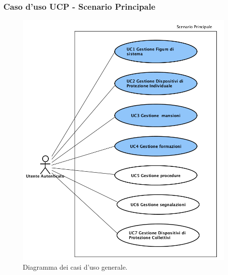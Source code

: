 	\subsubsection{Caso d'uso UCP - Scenario Principale }
	\begin{figure}[H]
		\begin{center}
			\includegraphics[width=11cm]{Pics/Diagramma_generale_dei_casi_d_uso.png}
			\caption{
				Diagramma dei casi d'uso generale.}
			\label{fig:DiagrammaGeneraleCasiDuso}
		\end{center}
	\end{figure}	
	
